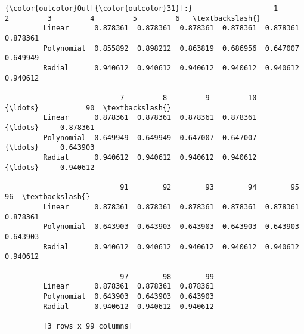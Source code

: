 \documentclass[11pt]{article}
\begin{document}
\begin{Verbatim}[commandchars=\\\{\}]
{\color{outcolor}Out[{\color{outcolor}31}]:}                   1         2         3         4         5         6   \textbackslash{}
         Linear      0.878361  0.878361  0.878361  0.878361  0.878361  0.878361   
         Polynomial  0.855892  0.898212  0.863819  0.686956  0.647007  0.649949   
         Radial      0.940612  0.940612  0.940612  0.940612  0.940612  0.940612   
         
                           7         8         9         10    {\ldots}           90  \textbackslash{}
         Linear      0.878361  0.878361  0.878361  0.878361    {\ldots}     0.878361   
         Polynomial  0.649949  0.649949  0.647007  0.647007    {\ldots}     0.643903   
         Radial      0.940612  0.940612  0.940612  0.940612    {\ldots}     0.940612   
         
                           91        92        93        94        95        96  \textbackslash{}
         Linear      0.878361  0.878361  0.878361  0.878361  0.878361  0.878361   
         Polynomial  0.643903  0.643903  0.643903  0.643903  0.643903  0.643903   
         Radial      0.940612  0.940612  0.940612  0.940612  0.940612  0.940612   
         
                           97        98        99  
         Linear      0.878361  0.878361  0.878361  
         Polynomial  0.643903  0.643903  0.643903  
         Radial      0.940612  0.940612  0.940612  
         
         [3 rows x 99 columns]
\end{Verbatim}
            
\end{document}

